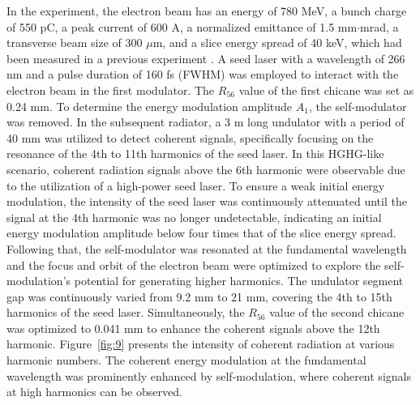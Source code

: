 \documentclass[%
 reprint,
 amsmath,amssymb,
 aps,
]{revtex4-2}
\begin{document}
In the experiment, the electron beam has an energy of 780 MeV, a bunch charge of 550 pC, a peak current of 600 A, a normalized emittance of 1.5 mm$\cdot$mrad, a transverse beam size of 300 $\mu$m, and a slice energy spread of 40 keV, which had been measured in a previous experiment \citep{Yan2021}. A seed laser with a wavelength of 266 nm and a pulse duration of 160 fs (FWHM) was employed to interact with the electron beam in the first modulator. The $R_{56}$ value of the first chicane was set as 0.24 mm. To determine the energy modulation amplitude $A_1$, the self-modulator was removed. In the subsequent radiator, a 3 m long undulator with a period of 40 mm was utilized to detect coherent signals, specifically focusing on the resonance of the 4th to 11th harmonics of the seed laser. In this HGHG-like scenario, coherent radiation signals above the 6th harmonic were observable due to the utilization of a high-power seed laser. To ensure a weak initial energy modulation, the intensity of the seed laser was continuously attenuated until the signal at the 4th harmonic was no longer undetectable, indicating an initial energy modulation amplitude below four times that of the slice energy spread. Following that, the self-modulator was resonated at the fundamental wavelength and the focus and orbit of the electron beam were optimized to explore the self-modulation's potential for generating higher harmonics. The undulator segment gap was continuously varied from 9.2 mm to 21 mm, covering the 4th to 15th harmonics of the seed laser. Simultaneously, the $R_{56}$ value of the second chicane was optimized to 0.041 mm to enhance the coherent signals above the 12th harmonic. Figure~\ref{fig:9} presents the intensity of coherent radiation at various harmonic numbers. The coherent energy modulation at the fundamental wavelength was prominently enhanced by self-modulation, where coherent signals at high harmonics can be observed.
\end{document}
